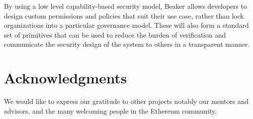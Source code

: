 \documentclass[english,a4paper]{article}
\begin{document}
By using a low level capability-based security model, Beaker allows
developers to design custom permissions and policies that suit their use
case, rather than lock organizations into a particular governance model.
These will also form a standard set of primitives that can be used to
reduce the burden of verification and communicate the security design of
the system to others in a transparent manner.

\section{Acknowledgments}\label{acknowledgments}
We would like to express our gratitude to other projects notably our
mentors and advisors, and the many welcoming people in the Ethereum
community.



\end{document}

